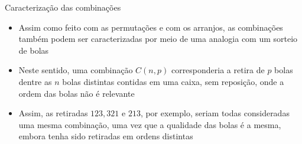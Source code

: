 \begin{frame}[fragile]{Caracterização das combinações}

    \begin{itemize}
        \item Assim como feito com as permutações e com os arranjos, as combinações também podem
            ser caracterizadas por meio de uma analogia com um sorteio de bolas

        \item Neste sentido, uma combinação $C(n, p)$ corresponderia a retira de $p$ bolas dentre
            as $n$ bolas distintas contidas em uma caixa, sem reposição, onde a ordem das bolas
            não é relevante

        \item Assim, as retiradas $123, 321$ e $213$, por exemplo, seriam todas consideradas uma
            mesma combinação, uma vez que a qualidade das bolas é a mesma, embora tenha sido
            retiradas em ordens distintas
    \end{itemize}

\end{frame}
